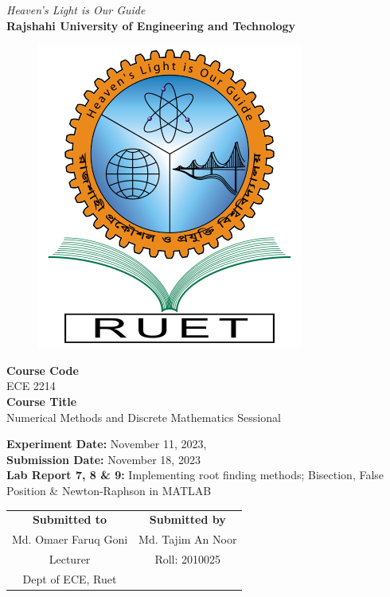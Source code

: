\vspace*{\fill}
\begin{center}

    \emph{Heaven's Light is Our Guide} \\
    \textbf{Rajshahi University of Engineering and Technology} \\

    \begin{figure}[H]
        \centering
        \includegraphics[scale=.34]{images/RUET_logo.png}
        \label{fig:ruet_logo}
    \end{figure}
    \vspace{5mm}

    \textbf{Course Code}\\
    ECE 2214\\
    \vspace{3mm}
    \textbf{Course Title}\\
    Numerical Methods and Discrete Mathematics Sessional

    \vspace{5mm}
    \textbf{Experiment Date:} November 11, 2023,\\
    \textbf{Submission Date:} {November 18, 2023}\\

    \vspace{5mm}
    \textbf{Lab Report 7, 8 \& 9:} Implementing root finding methods; Bisection, False Position \& Newton-Raphson in MATLAB

    \vspace{15mm}

    \begin{tabular}{c|c}
        \textbf{Submitted to} & \textbf{Submitted by} \\
        Md. Omaer Faruq Goni  & Md. Tajim An Noor     \\
        Lecturer              & Roll: 2010025         \\
        Dept of ECE, Ruet     &                       \\
    \end{tabular}

\end{center}
\vspace*{\fill}
